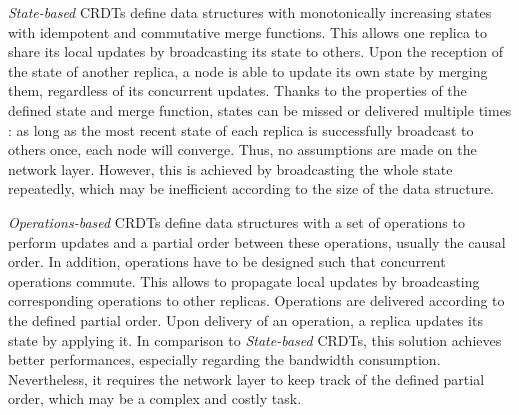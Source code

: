 \documentclass{article}
\begin{document}

\emph{State-based} \acp{CRDT} define data structures with monotonically increasing states with idempotent and commutative merge functions.
This allows one replica to share its local updates by broadcasting its state to others.
Upon the reception of the state of another replica, a node is able to update its own state by merging them,
regardless of its concurrent updates.
Thanks to the properties of the defined state and merge function, states can be missed or delivered multiple times :
as long as the most recent state of each replica is successfully broadcast to others once, each node will converge.
Thus, no assumptions are made on the network layer.
However, this is achieved by broadcasting the whole state repeatedly, which may be inefficient according to the size of the data structure.


\emph{Operations-based} \acp{CRDT} define data structures with a set of operations to perform updates
and a partial order between these operations, usually the causal order\cite{Prakash:1997:ACO:255495.255508}.
In addition, operations have to be designed such that concurrent operations commute.
This allows to propagate local updates by broadcasting corresponding operations to other replicas.
Operations are delivered according to the defined partial order.
Upon delivery of an operation, a replica updates its state by applying it.
In comparison to \emph{State-based} \acp{CRDT}, this solution achieves better performances, especially regarding the bandwidth consumption.
Nevertheless, it requires the network layer to keep track of the defined partial order, which may be a complex and costly task.

\end{document}
